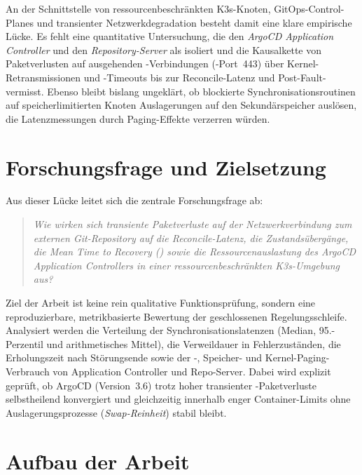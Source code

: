 An der Schnittstelle von ressourcenbeschränkten K3s-Knoten, GitOps-Control-Planes und transienter Netzwerkdegradation besteht damit eine klare empirische Lücke. Es fehlt eine quantitative Untersuchung, die den \textit{ArgoCD Application Controller} und den \textit{Repository-Server} als  isoliert und die Kausalkette von Paketverlusten auf ausgehenden -Verbindungen (-Port~443) über Kernel-Retransmissionen und -Timeouts bis zur Reconcile-Latenz und Post-Fault- vermisst. Ebenso bleibt bislang ungeklärt, ob blockierte Synchronisationsroutinen auf speicherlimitierten Knoten Auslagerungen auf den Sekundärspeicher auslösen, die Latenzmessungen durch Paging-Effekte verzerren würden.\autocite[Abschn.~7.2, S.~305--309]{gregg_systems_2020}

\section{Forschungsfrage und Zielsetzung}
\label{sec:forschungsfrage-zielsetzung}

Aus dieser Lücke leitet sich die zentrale Forschungsfrage ab:

\begin{quote}
\textit{Wie wirken sich transiente Paketverluste auf der Netzwerkverbindung zum externen Git-Repository auf die Reconcile-Latenz, die Zustandsübergänge, die Mean Time to Recovery () sowie die Ressourcenauslastung des ArgoCD Application Controllers in einer ressourcenbeschränkten K3s-Umgebung aus?}
\end{quote}

Ziel der Arbeit ist keine rein qualitative Funktionsprüfung, sondern eine reproduzierbare, metrikbasierte Bewertung der geschlossenen Regelungsschleife. Analysiert werden die Verteilung der Synchronisationslatenzen (Median, 95.-Perzentil und arithmetisches Mittel), die Verweildauer in Fehlerzuständen, die Erholungszeit nach Störungsende sowie der -, Speicher- und Kernel-Paging-Verbrauch von Application Controller und Repo-Server. Dabei wird explizit geprüft, ob ArgoCD (Version~3.6) trotz hoher transienter -Paketverluste selbstheilend konvergiert und gleichzeitig innerhalb enger Container-Limits ohne Auslagerungsprozesse (\textit{Swap-Reinheit}) stabil bleibt.

\section{Aufbau der Arbeit}
\label{sec:aufbau-der-arbeit}

